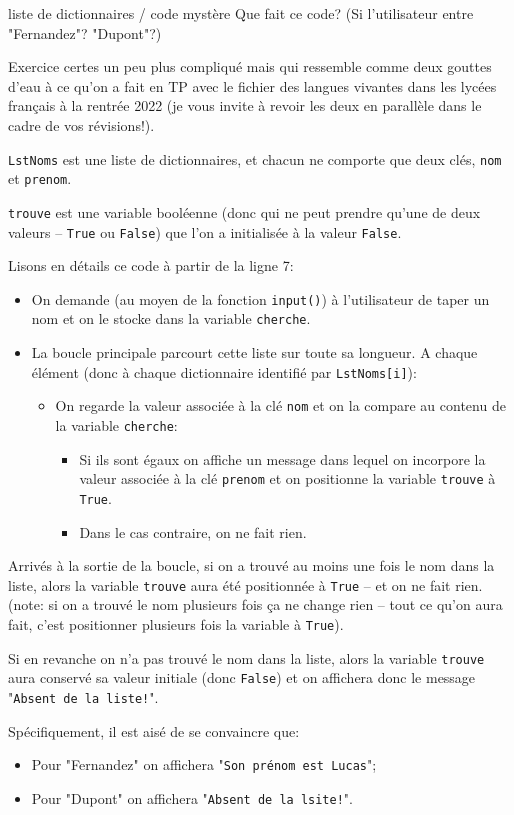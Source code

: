 \documentclass[12pt]{article}
\begin{document}
	\begin{MonQz}{liste de dictionnaires / code mystère}
		Que fait ce code? (Si l'utilisateur entre "Fernandez"? "Dupont"?)
	\end{MonQz}
	\begin{MaReponse}
		Exercice certes un peu plus compliqué mais qui ressemble comme deux gouttes d'eau à ce qu'on a fait en TP avec le fichier des langues vivantes dans les lycées français à la rentrée 2022 (je vous invite à revoir les deux en parallèle dans le cadre de vos révisions!).
		
		\texttt{LstNoms} est une liste de dictionnaires, et chacun ne comporte que deux clés, \texttt{nom} et \texttt{prenom}.
		
		\texttt{trouve} est une variable booléenne (donc qui ne peut prendre qu'une de deux valeurs -- \texttt{True} ou \texttt{False}) que l'on a initialisée à la valeur \texttt{False}.
		
		Lisons en détails ce code à partir de la ligne 7:
		\begin{itemize}
			\item On demande (au moyen de la fonction \texttt{input()}) à l'utilisateur de taper un nom et on le stocke dans la variable \texttt{cherche}.
			\item La boucle principale parcourt cette liste sur toute sa longueur. A chaque élément
			  (donc à chaque dictionnaire identifié par \texttt{LstNoms[i]}):
			  \begin{itemize}
			  	\item On regarde la valeur associée à la clé \texttt{nom} et on la compare au contenu de la variable \texttt{cherche}:
			  	\begin{itemize}
			  		\item Si ils sont égaux on affiche un message dans lequel on incorpore la valeur associée à la clé \texttt{prenom} et on positionne la variable \texttt{trouve} à \texttt{True}.
			  		\item Dans le cas contraire, on ne fait rien.
			  	\end{itemize}
			  \end{itemize}
		\end{itemize}
		Arrivés à la sortie de la boucle, si on a trouvé au moins une fois le nom dans la liste, alors la variable \texttt{trouve} aura été positionnée à \texttt{True} -- et on ne fait rien. (note: si on a trouvé le nom plusieurs fois ça ne change rien -- tout ce qu'on aura fait, c'est positionner plusieurs fois la variable à \texttt{True}).
		
		Si en revanche on n'a pas trouvé le nom dans la liste, alors la variable \texttt{trouve} aura  conservé sa valeur initiale (donc \texttt{False}) et on affichera donc le message "\texttt{Absent de la liste!}".
		
		Spécifiquement, il est aisé de se convaincre que:
		\begin{itemize}
			\item Pour "Fernandez" on affichera "\texttt{Son prénom est Lucas}";
			\item Pour "Dupont" on affichera "\texttt{Absent de la lsite!}".
		\end{itemize}
	\end{MaReponse}
\end{document}
